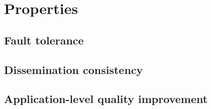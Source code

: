 \section{Properties}
\subsection{Fault tolerance}



\subsection{Dissemination consistency}
\subsection{Application-level quality improvement}
